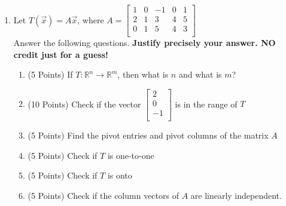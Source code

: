 \documentclass[12pt]{article}
\begin{document}
\begin{enumerate}
	\item Let $T() = A$, where $A = 
		$\\
		Answer the following questions. \textbf{Justify precisely your answer. NO credit just for a guess!}
	\begin{enumerate}
		\item (5 Points) If $T : ^n \longrightarrow {}^m$, then what is $n$ and what is $m$?
		\item (10 Points) Check if the vector
			$\left[\begin{array}{r}
				2\\
				0\\
				-1\\
			\end{array}\right] $ is in the range of $T$
		\item (5 Points) Find the pivot entries and pivot columns of the matrix $A$
		\item (5 Points) Check if $T$ is one-to-one
		\item (5 Points) Check if $T$ is onto
		\item (5 Points) Check if the column vectors of $A$ are linearly independent.
	\end{enumerate}
\end{enumerate}
\end{document}
